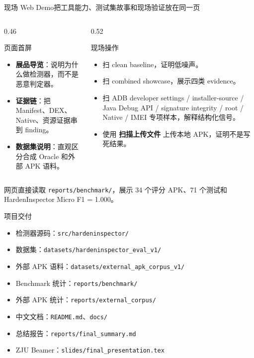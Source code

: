 \documentclass[10pt,aspectratio=169]{beamer}
\begin{document}
\begin{frame}{现场 Web Demo}{把工具能力、测试集故事和现场验证放在同一页}
  \begin{columns}[T,totalwidth=\textwidth]
    \begin{column}{0.46\textwidth}
      \begin{block}{页面首屏}
        \begin{itemize}
          \item \textbf{展品导览}：说明为什么做检测器，而不是恶意判定器。
          \item \textbf{证据链}：把 Manifest、DEX、Native、资源证据串到 finding。
          \item \textbf{数据集说明}：直观区分合成 Oracle 和外部 APK 语料。
        \end{itemize}
      \end{block}
    \end{column}
    \begin{column}{0.52\textwidth}
      \begin{block}{现场操作}
        \begin{itemize}
          \item 扫 clean baseline，证明低噪声。
          \item 扫 combined showcase，展示四类 evidence。
          \item 扫 ADB developer settings / installer-source / Java Debug API / signature integrity / root / Native / IMEI 专项样本，解释结构化信号。
          \item 使用 \textbf{扫描上传文件} 上传本地 APK，证明不是写死结果。
        \end{itemize}
      \end{block}
    \end{column}
  \end{columns}
  \vspace{0.35em}
  网页直接读取 \texttt{reports/benchmark/}，展示 34 个评分 APK、71 个测试和 HardenInspector Micro F1 = 1.000。
\end{frame}

\begin{frame}{项目交付}
  \begin{itemize}
    \item 检测器源码：\texttt{src/hardeninspector/}
    \item 数据集：\texttt{datasets/hardeninspector\_eval\_v1/}
    \item 外部 APK 语料：\texttt{datasets/external\_apk\_corpus\_v1/}
    \item Benchmark 统计：\texttt{reports/benchmark/}
    \item 外部 APK 统计：\texttt{reports/external\_corpus/}
    \item 中文文档：\texttt{README.md}、\texttt{docs/}
    \item 总结报告：\texttt{reports/final\_summary.md}
    \item ZJU Beamer：\texttt{slides/final\_presentation.tex}
  \end{itemize}
\end{frame}
\end{document}

